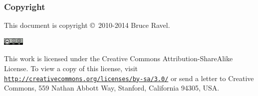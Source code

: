 
\begin{frame}
  \frametitle{Copyright}
  \tiny

  This document is copyright \copyright\ 2010-2014 Bruce Ravel.

  \begin{center}
    \includegraphics[width=1.0cm]{cc-by-sa.png}
  \end{center}

  This work is licensed under the Creative Commons
  Attribution-ShareAlike License.  To view a copy of this license,
  visit \href{http://creativecommons.org/licenses/by-sa/3.0/}
  {\color{Purple4}\texttt{http://creativecommons.org/licenses/by-sa/3.0/}}
  or send a letter to Creative Commons, 559 Nathan Abbott Way,
  Stanford, California 94305, USA.


\end{frame}
